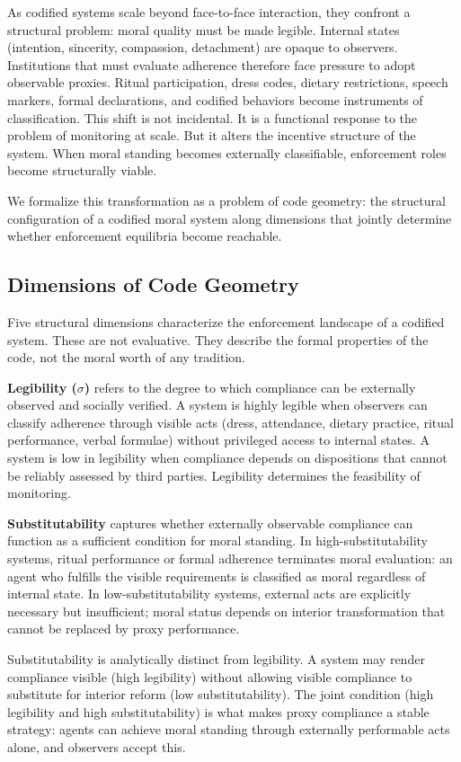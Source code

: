 \documentclass[12pt]{article}
\begin{document}
As codified systems scale beyond face-to-face interaction, they confront a structural problem: moral quality must be made legible. Internal states (intention, sincerity, compassion, detachment) are opaque to observers. Institutions that must evaluate adherence therefore face pressure to adopt observable proxies. Ritual participation, dress codes, dietary restrictions, speech markers, formal declarations, and codified behaviors become instruments of classification. This shift is not incidental. It is a functional response to the problem of monitoring at scale. But it alters the incentive structure of the system. When moral standing becomes externally classifiable, enforcement roles become structurally viable.

We formalize this transformation as a problem of code geometry: the structural configuration of a codified moral system along dimensions that jointly determine whether enforcement equilibria become reachable.

\subsection{Dimensions of Code Geometry}

Five structural dimensions characterize the enforcement landscape of a codified system. These are not evaluative. They describe the formal properties of the code, not the moral worth of any tradition.

\textbf{Legibility ($\sigma$)} refers to the degree to which compliance can be externally observed and socially verified. A system is highly legible when observers can classify adherence through visible acts (dress, attendance, dietary practice, ritual performance, verbal formulae) without privileged access to internal states. A system is low in legibility when compliance depends on dispositions that cannot be reliably assessed by third parties. Legibility determines the feasibility of monitoring.

\textbf{Substitutability} captures whether externally observable compliance can function as a sufficient condition for moral standing. In high-substitutability systems, ritual performance or formal adherence terminates moral evaluation: an agent who fulfills the visible requirements is classified as moral regardless of internal state. In low-substitutability systems, external acts are explicitly necessary but insufficient; moral status depends on interior transformation that cannot be replaced by proxy performance.

Substitutability is analytically distinct from legibility. A system may render compliance visible (high legibility) without allowing visible compliance to substitute for interior reform (low substitutability). The joint condition (high legibility and high substitutability) is what makes proxy compliance a stable strategy: agents can achieve moral standing through externally performable acts alone, and observers accept this.
\end{document}
